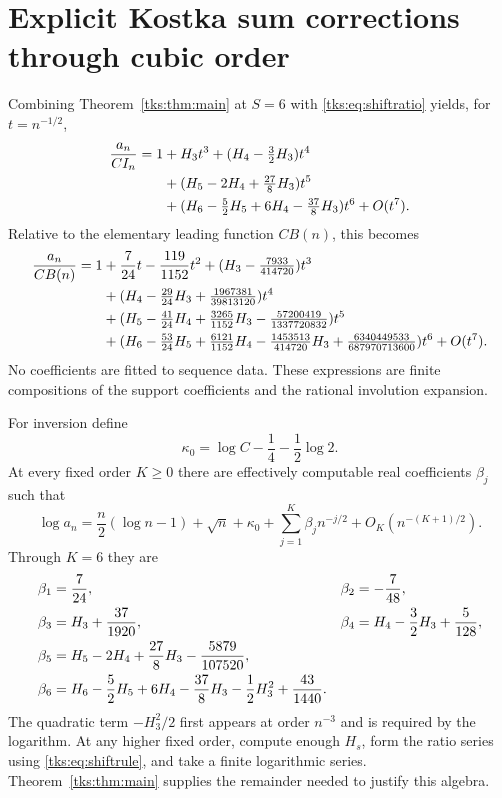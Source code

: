 \section{Explicit Kostka sum corrections through cubic order}\label{tks:sec:expansions}
Combining Theorem~\ref{tks:thm:main} at $S=6$ with \eqref{tks:eq:shiftratio} yields, for $t=n^{-1/2}$,
\begin{align}
\frac{a_n}{CI_n}=1
 &+H_3t^3+(H_4-\tfrac32H_3)t^4\notag\\
 &+(H_5-2H_4+\tfrac{27}{8}H_3)t^5\notag\\
 &+(H_6-\tfrac52H_5+6H_4-\tfrac{37}{8}H_3)t^6
 +O(t^7).\label{tks:eq:normalizeda}
\end{align}
Relative to the elementary leading function $CB(n)$, this becomes
\begin{align}
\frac{a_n}{CB(n)}=1
 &+\frac7{24}t-\frac{119}{1152}t^2
 +(H_3-\tfrac{7933}{414720})t^3\notag\\
 &+(H_4-\tfrac{29}{24}H_3+\tfrac{1967381}{39813120})t^4\notag\\
 &+(H_5-\tfrac{41}{24}H_4+\tfrac{3265}{1152}H_3
          -\tfrac{57200419}{1337720832})t^5\notag\\
 &+(H_6-\tfrac{53}{24}H_5+\tfrac{6121}{1152}H_4
          -\tfrac{1453513}{414720}H_3
          +\tfrac{6340449533}{687970713600})t^6
 +O(t^7).\label{tks:eq:amultiplier}
\end{align}
No coefficients are fitted to sequence data. These expressions are finite compositions of the support coefficients and the rational involution expansion.

For inversion define
\begin{equation}\label{tks:eq:kappa}
\kappa_0=\log C-\frac14-\frac12\log2.
\end{equation}
At every fixed order $K\geq0$ there are effectively computable real coefficients $\beta_j$ such that
\begin{equation}\label{tks:eq:loga}
\log a_n=\frac n2(\log n-1)+\sqrt n+\kappa_0
 +\sum_{j=1}^{K}\beta_j n^{-j/2}
 +O_K(n^{-(K+1)/2}).
\end{equation}
Through $K=6$ they are
\begin{align}
\beta_1&=\frac7{24},&
\beta_2&=-\frac7{48},\notag\\
\beta_3&=H_3+\frac{37}{1920},&
\beta_4&=H_4-\frac32H_3+\frac5{128},\notag\\
\beta_5&=H_5-2H_4+\frac{27}{8}H_3-\frac{5879}{107520},\notag\\
\beta_6&=H_6-\frac52H_5+6H_4-\frac{37}{8}H_3
             -\frac12H_3^2+\frac{43}{1440}.\label{tks:eq:betas}
\end{align}
The quadratic term $-H_3^2/2$ first appears at order $n^{-3}$ and is required by the logarithm. At any higher fixed order, compute enough $H_s$, form the ratio series using \eqref{tks:eq:shiftrule}, and take a finite logarithmic series. Theorem~\ref{tks:thm:main} supplies the remainder needed to justify this algebra.

